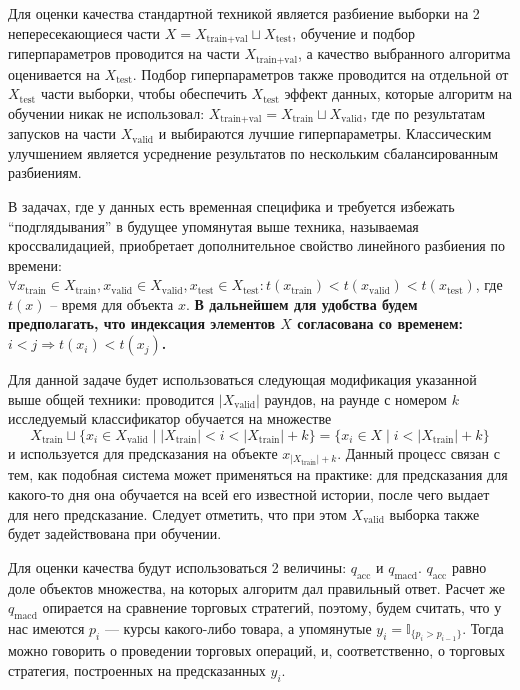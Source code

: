 \documentclass[pdftex,ptm,14pt,a4paper]{extreport}
\begin{document}
Для оценки качества стандартной техникой является разбиение выборки на 2 непересекающиеся части
$X = X_\text{train+val} \sqcup X_\text{test}$, обучение и подбор гиперпараметров проводится на части $X_\text{train+val}$,
а качество выбранного алгоритма оценивается на $X_\text{test}$.
Подбор гиперпараметров также проводится на отдельной от $X_\text{test}$ части выборки, чтобы обеспечить $X_\text{test}$ эффект
данных, которые алгоритм на обучении никак не использовал:
$X_\text{train+val} = X_\text{train} \sqcup X_\text{valid}$, где по результатам
запусков на части $X_\text{valid}$ и выбираются лучшие гиперпараметры. Классическим улучшением является усреднение результатов
по нескольким сбалансированным разбиениям.

В задачах, где у данных есть временная специфика и требуется избежать ``подглядывания'' в будущее упомянутая выше техника,
называемая кроссвалидацией, приобретает дополнительное свойство линейного разбиения по времени: $\forall x_\text{train}\in X_\text{train}, x_\text{valid}\in X_\text{valid}, x_\text{test}\in X_\text{test}:
t(x_\text{train} ) < t(x_\text{valid} ) < t(x_\text{test} )$, где $t(x)$ -- время для объекта $x$.
\textbf{В дальнейшем для удобства будем предполагать, что индексация элементов $X$ согласована со временем:
$i<j\Rightarrow t(x_i)<t(x_j)$.}

Для данной задаче будет использоваться следующая модификация указанной выше общей техники: проводится
$|X_\text{valid}|$ раундов, на раунде с номером $k$ исследуемый классификатор обучается на множестве
\[X_\text{train} \sqcup \{x_i \in X_\text{valid} \mid |X_\text{train}| < i < |X_\text{train}| + k\} =
\{x_i\in X \mid i < |X_\text{train}| + k\} \]
и используется для предсказания на объекте $x_{|X_\text{train}|+k}$. Данный процесс связан с тем, как подобная система
может применяться на практике: для предсказания для какого-то дня она обучается на всей его известной истории, после чего
выдает для него предсказание. Следует отметить, что при этом $X_\text{valid}$ выборка также будет задействована при обучении.

Для оценки качества будут использоваться 2 величины: $q_\text{acc}$ и $q_\text{macd}$. $q_\text{acc}$ равно доле объектов
множества, на которых алгоритм дал правильный ответ. Расчет же $q_\text{macd}$ опирается на сравнение торговых стратегий,
поэтому, будем считать, что у нас имеются $p_i$ --- курсы какого-либо товара, а упомянутые
$y_i=\mathbb{I}_{\{p_i > p_{i-1}\}}$.
Тогда можно говорить о проведении торговых операций, и, соответственно, о торговых стратегия, построенных на предсказанных $y_i$.
\end{document}
